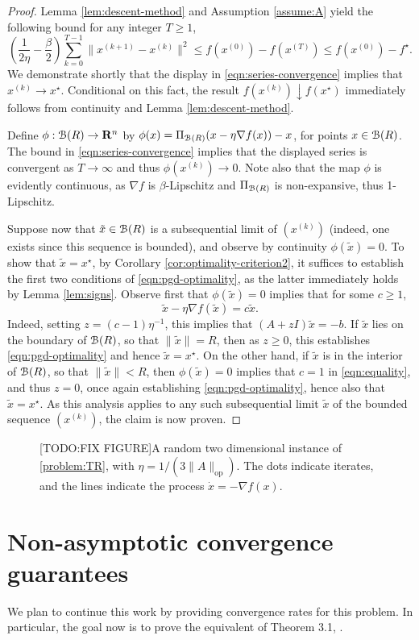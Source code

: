 \documentclass[11pt]{article}
\newcommand{\proj}{\ensuremath{\Pi_{\B(R)}}}
\begin{document}
\begin{proof}
Lemma \ref{lem:descent-method} and 
Assumption \ref{assume:A} yield the following bound for any integer $T \geq 1$, 
\begin{equation}
\label{eqn:series-convergence}
\left(\frac{1}{2\eta} - \frac{\beta}{2} \right)\sum_{k=0}^{T - 1} 
\|x^{(k + 1)} - x^{(k)}\|^2 
\leq f(x^{(0)}) - f(x^{(T)}) 
\leq f(x^{(0)}) - f^\star. 
\end{equation}
We demonstrate shortly that the display in \eqref{eqn:series-convergence} implies that $x^{(k)} \to x^\star$. Conditional on 
this fact, the result $f(x^{(k)}) \downarrow f(x^\star)$ immediately follows from continuity and Lemma \ref{lem:descent-method}.

Define 
$\phi: \mathcal{B}(R) \to \mathbf{R}^n$ 
by $\phi(x) = \proj(x - \eta \nabla f(x)) - x$, for points $x \in \mathcal{B}(R)$. 
The bound in \eqref{eqn:series-convergence} implies that the displayed series is convergent as $T \to \infty$ and thus 
$\phi(x^{(k)}) \to 0$. 
Note also that the map $\phi$ is evidently continuous, as $\nabla f$ is $\beta$-Lipschitz and $\proj$ is 
non-expansive, thus 1-Lipschitz. 

Suppose now that $\tilde x \in \mathcal{B}(R)$ is a subsequential 
limit of $(x^{(k)})$ (indeed, one exists since this sequence is bounded), and observe by
continuity $\phi(\tilde x) = 0$. To show that $\tilde x = x^\star$, by Corollary \ref{cor:optimality-criterion2}, it
suffices to establish the first two conditions of \eqref{eqn:pgd-optimality}, as the latter immediately holds by
Lemma \ref{lem:signs}. Observe first that $\phi(\tilde x) = 0$ implies that for some $c \geq 1$,
\begin{equation}\label{eqn:equality}
\tilde x - \eta \nabla f(\tilde x) = c \tilde x.
\end{equation}
Indeed, setting $z = (c - 1)\eta^{-1}$, this implies that $(A + zI)\tilde x = -b$. 
If $\tilde x$ lies on the boundary of $\mathcal{B}(R)$, so that $\|\tilde x\| = R$, then as $z \geq 0$,
this establishes \eqref{eqn:pgd-optimality} and hence $\tilde x = x^\star$. On the other hand,
if $\tilde x$ is in the interior of $\mathcal{B}(R)$, so that $\|\tilde x\| < R$, then
$\phi(\tilde x) = 0$ implies that $c = 1$ in \eqref{eqn:equality}, and thus $z = 0$, once again
establishing \eqref{eqn:pgd-optimality}, hence also that $\tilde x = x^\star$. As this analysis applies
to any such subsequential limit $\tilde x$ of the bounded sequence $(x^{(k)})$, the claim is now proven.
\end{proof}
\begin{figure}
    \centering
    \caption{[TODO:FIX FIGURE]A random two dimensional instance of \eqref{problem:TR}, with $\eta = 1/(3\|A\|_{\mathrm{op}})$. The dots indicate iterates,
      and the lines indicate the process $\dot x = -\nabla f(x)$.}
    \label{fig:convergence-2D}
\end{figure}
\section{Non-asymptotic convergence guarantees}
We plan to continue this work by providing convergence rates for this problem. In particular, the goal now is
to prove the equivalent of Theorem 3.1, \cite{carmon2016}.

\end{document}
